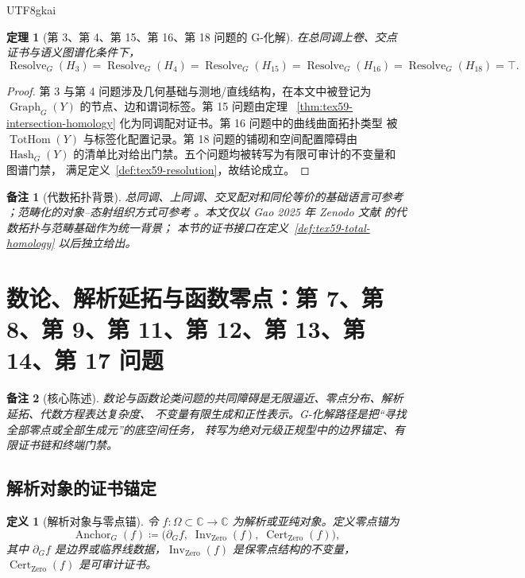 \documentclass[12pt]{article}
\newtheorem{definition}{定义}[section]
\newtheorem{theorem}{定理}[section]
\newtheorem{remark}{备注}[section]
\newcommand{\CC}{\mathbb{C}}
\newcommand{\DefEq}{\coloneqq}
\DeclareMathOperator{\Cert}{Cert}
\DeclareMathOperator{\Resolve}{Resolve}
\DeclareMathOperator{\Inv}{Inv}
\DeclareMathOperator{\TotHom}{TotHom}
\DeclareMathOperator{\Graph}{Graph}
\DeclareMathOperator{\Hash}{Hash}
\DeclareMathOperator{\Zero}{Zero}
\DeclareMathOperator{\Anchor}{Anchor}
\begin{document}
\begin{CJK*}{UTF8}{gkai}
\begin{theorem}[第 3、第 4、第 15、第 16、第 18 问题的 G-化解]
\label{thm:tex59-geometry-cluster}
在总同调上卷、交点证书与语义图谱化条件下，
\[
  \Resolve_G(H_3)=\Resolve_G(H_4)=\Resolve_G(H_{15})
  =\Resolve_G(H_{16})=\Resolve_G(H_{18})=\top.
\]
\end{theorem}

\begin{proof}
第 3 与第 4 问题涉及几何基础与测地/直线结构，在本文中被登记为
\(\Graph_G(Y)\) 的节点、边和谓词标签。第 15 问题由定理
~\ref{thm:tex59-intersection-homology} 化为同调配对证书。第 16 问题中的曲线曲面拓扑类型
被 \(\TotHom(Y)\) 与标签化配置记录。第 18 问题的铺砌和空间配置障碍由
\(\Hash_G(Y)\) 的清单比对给出门禁。五个问题均被转写为有限可审计的不变量和图谱门禁，
满足定义~\ref{def:tex59-resolution}，故结论成立。
\end{proof}

\begin{remark}[代数拓扑背景]
总同调、上同调、交叉配对和同伦等价的基础语言可参考
\cite{Hatcher2002AT,Weibel1994HomologicalAlgebra}；范畴化的对象--态射组织方式可参考
\cite{MacLane1998Categories}。本文仅以 Gao 2025 年 Zenodo 文献
\cite{Gao2025PureMathZenodo} 的代数拓扑与范畴基础作为统一背景；
本节的证书接口在定义~\ref{def:tex59-total-homology} 以后独立给出。
\end{remark}

\section{数论、解析延拓与函数零点：第 7、第 8、第 9、第 11、第 12、第 13、第 14、第 17 问题}
\label{sec:tex59-number-theory}

\begin{remark}[核心陈述]
数论与函数论类问题的共同障碍是无限逼近、零点分布、解析延拓、代数方程表达复杂度、
不变量有限生成和正性表示。G-化解路径是把“寻找全部零点或全部生成元”的底空间任务，
转写为绝对元级正规型中的边界锚定、有限证书链和终端门禁。
\end{remark}

\subsection{解析对象的证书锚定}
\label{subsec:tex59-zero-anchor}

\begin{definition}[解析对象与零点锚]
\label{def:tex59-zero-anchor}
令 \(f:\Omega\subset\CC\to\CC\) 为解析或亚纯对象。定义零点锚为
\[
  \Anchor_G(f)
  \DefEq
  \bigl(
    \partial_G f,\;
    \Inv_{\Zero}(f),\;
    \Cert_{\Zero}(f)
  \bigr),
\]
其中 \(\partial_G f\) 是边界或临界线数据，\(\Inv_{\Zero}(f)\) 是保零点结构的不变量，
\(\Cert_{\Zero}(f)\) 是可审计证书。
\end{definition}


\end{CJK*}
\end{document}

